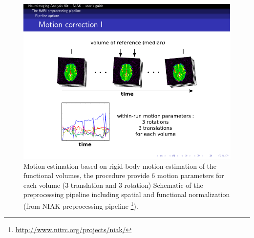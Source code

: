 \begin{figure}[H]
\begin{center}
\includegraphics[scale=0.9]{../figures/motion_estimation.pdf}
\end{center}
\caption[Motion estimation]
{Motion estimation based on rigid-body motion estimation of the functional volumes, the procedure provide 6 motion parameters for each volume (3 translation and 3 rotation) Schematic of the preprocessing pipeline including spatial and functional normalization (from NIAK preprocessing pipeline \footnote{\url{http://www.nitrc.org/projects/niak/}}).}
\label{fig_motion_estimation}
\end{figure}



